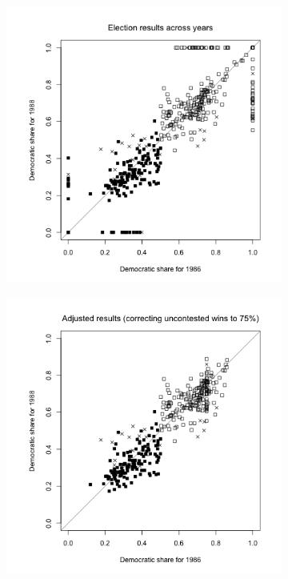 \documentclass[a4paper, 11pt]{article}
\begin{document}
\begin{figure}[H]
\centering
\begin{subfigure}{.5\textwidth}
  \centering
  \includegraphics[width=1\linewidth]{plot_ex4_2.png}
\end{subfigure}%
\begin{subfigure}{.5\textwidth}
  \centering
  \includegraphics[width=1\linewidth]{plot_ex4_3.png}
\end{subfigure}
\end{figure}
\end{document}
